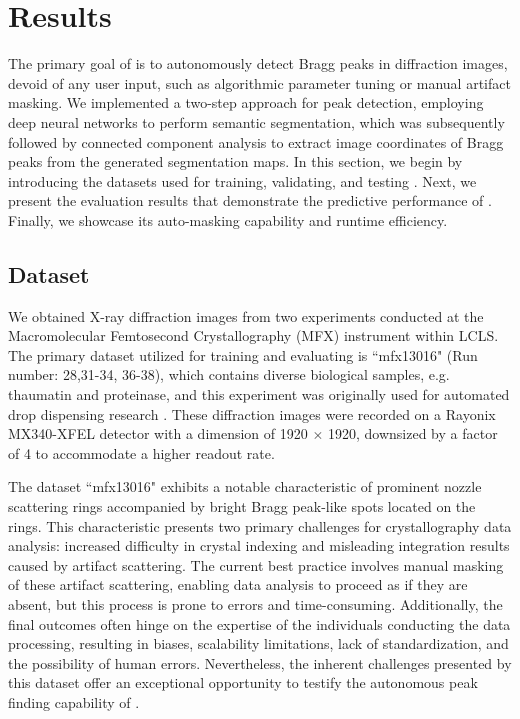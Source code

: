 \documentclass[a4paper]{article}
\begin{document}
\section{Results}

The primary goal of \peaknet{} is to autonomously detect Bragg peaks in diffraction images, devoid of any user input, such as algorithmic parameter tuning or manual artifact masking.  We implemented a two-step approach for peak detection, employing deep neural networks to perform semantic segmentation, which was subsequently followed by connected component analysis to extract image coordinates of Bragg peaks from the generated segmentation maps.  In this section, we begin by introducing the datasets used for training, validating, and testing \peaknet{}. Next, we present the evaluation results that demonstrate the predictive performance of \peaknet{}. Finally, we showcase its auto-masking capability and runtime efficiency.


\subsection{Dataset}

We obtained X-ray diffraction images from two experiments conducted at the Macromolecular Femtosecond Crystallography (MFX) instrument within LCLS.  The primary dataset utilized for training and evaluating \peaknet{} is ``mfx13016" (Run number: 28,31-34, 36-38), which contains diverse biological samples, e.g.  thaumatin and proteinase, and this experiment was originally used for automated drop dispensing research \citep{suSerialCrystallographyUsing2021}.  These diffraction images were recorded on a Rayonix MX340-XFEL detector with a dimension of 1920 $\times$ 1920, downsized by a factor of 4 to accommodate a higher readout rate.  

The dataset ``mfx13016" exhibits a notable characteristic of prominent nozzle scattering rings accompanied by bright Bragg peak-like spots located on the rings.  This characteristic presents two primary challenges for crystallography data analysis: increased difficulty in crystal indexing and misleading integration results caused by artifact scattering.  The current best practice involves manual masking of these artifact scattering, enabling data analysis to proceed as if they are absent, but this process is prone to errors and time-consuming.  Additionally, the final outcomes often hinge on the expertise of the individuals conducting the data processing, resulting in biases, scalability limitations, lack of standardization, and the possibility of human errors.  Nevertheless, the inherent challenges presented by this dataset offer an exceptional opportunity to testify the autonomous peak finding capability of \peaknet{}.
\end{document}
